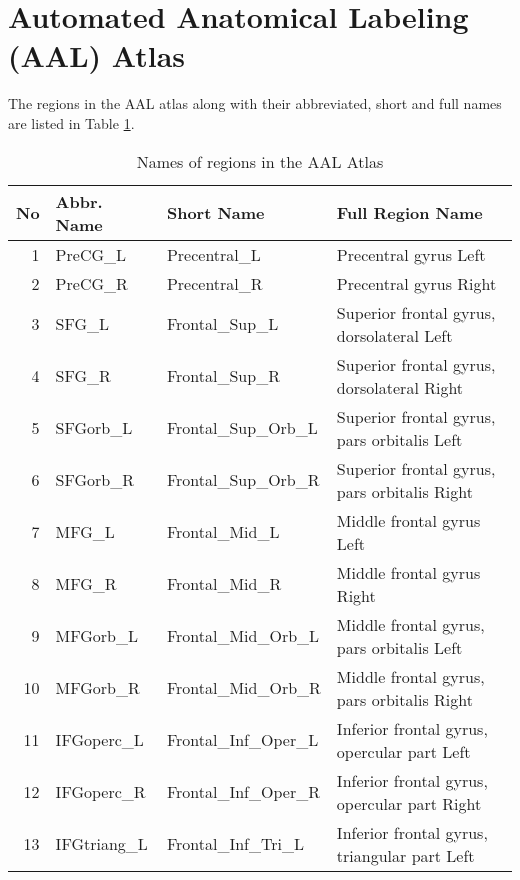 \documentclass[12pt,reqno]{amsart}
\theoremstyle{definition}
\begin{document}



\appendix
\section{Automated Anatomical Labeling (AAL) Atlas}\label{appen:aal}

The regions in the AAL atlas along with their abbreviated, short and full names are listed in Table \ref{tab:aal}. 

\begin{longtable}{rlll}
\caption{Names of regions in the AAL Atlas}\label{tab:aal}\\
\toprule
 No &    Abbr. Name &            Short Name &                                           Full Region Name \\
\midrule
  1 &     PreCG\_L &         Precentral\_L &                              Precentral gyrus Left \\
  2 &     PreCG\_R &         Precentral\_R &                             Precentral gyrus Right \\
  3 &       SFG\_L &        Frontal\_Sup\_L &          Superior frontal gyrus, dorsolateral Left \\
  4 &       SFG\_R &        Frontal\_Sup\_R &         Superior frontal gyrus, dorsolateral Right \\
  5 &    SFGorb\_L &    Frontal\_Sup\_Orb\_L &        Superior frontal gyrus, pars orbitalis Left \\
  6 &    SFGorb\_R &    Frontal\_Sup\_Orb\_R &       Superior frontal gyrus, pars orbitalis Right \\
  7 &       MFG\_L &        Frontal\_Mid\_L &                          Middle frontal gyrus Left \\
  8 &       MFG\_R &        Frontal\_Mid\_R &                         Middle frontal gyrus Right \\
  9 &    MFGorb\_L &    Frontal\_Mid\_Orb\_L &          Middle frontal gyrus, pars orbitalis Left \\
 10 &    MFGorb\_R &    Frontal\_Mid\_Orb\_R &         Middle frontal gyrus, pars orbitalis Right \\
 11 &  IFGoperc\_L &   Frontal\_Inf\_Oper\_L &        Inferior frontal gyrus, opercular part Left \\
 12 &  IFGoperc\_R &   Frontal\_Inf\_Oper\_R &       Inferior frontal gyrus, opercular part Right \\
 13 & IFGtriang\_L &    Frontal\_Inf\_Tri\_L &       Inferior frontal gyrus, triangular part Left \\

\end{longtable}
\end{document}
